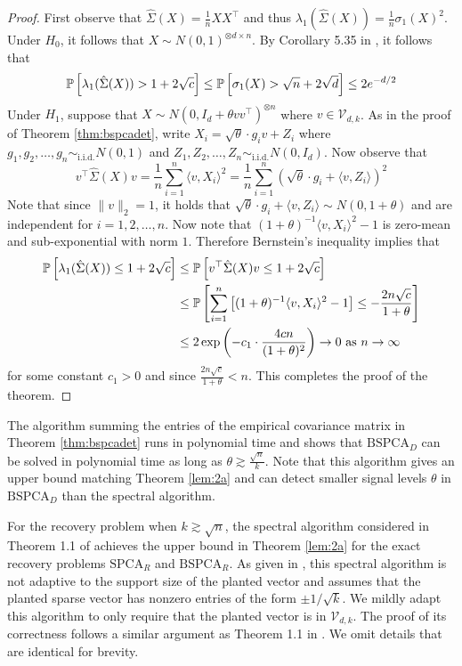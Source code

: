 \begin{proof}
First observe that $\hat{\Sigma}(X) = \frac{1}{n} XX^\top$ and thus $\lambda_1(\hat{\Sigma}(X)) = \frac{1}{n} \sigma_1(X)^2$. Under $H_0$, it follows that $X \sim N(0, 1)^{\otimes d \times n}$. By Corollary 5.35 in \cite{vershynin2010introduction}, it follows that
$$\mathbb{P}\left[ \lambda_1(\hat{\Sigma}(X)) > 1 + 2\sqrt{c} \right] \le \mathbb{P}\left[ \sigma_1(X) > \sqrt{n} + 2\sqrt{d} \right] \le 2e^{-d/2}$$
Under $H_1$, suppose that $X \sim N(0, I_d + \theta vv^\top)^{\otimes n}$ where $v \in \mathcal{V}_{d, k}$. As in the proof of Theorem \ref{thm:bspcadet}, write $X_i = \sqrt{\theta} \cdot g_i v + Z_i$ where $g_1, g_2, \dots, g_n \sim_{\text{i.i.d.}} N(0, 1)$ and $Z_1, Z_2, \dots, Z_n \sim_{\text{i.i.d.}} N(0, I_d)$. Now observe that
$$v^\top \hat{\Sigma}(X) v = \frac{1}{n} \sum_{i = 1}^n \langle v, X_i \rangle^2 = \frac{1}{n} \sum_{i = 1}^n \left( \sqrt{\theta} \cdot g_i + \langle v, Z_i \rangle \right)^2$$
Note that since $\| v \|_2 = 1$, it holds that $\sqrt{\theta} \cdot g_i + \langle v, Z_i \rangle \sim N(0, 1 + \theta)$ and are independent for $i = 1, 2, \dots, n$. Now note that $(1 + \theta)^{-1} \langle v, X_i \rangle^2 - 1$ is zero-mean and sub-exponential with norm $1$. Therefore Bernstein's inequality implies that
\begin{align*}
\mathbb{P}\left[ \lambda_1(\hat{\Sigma}(X)) \le 1 + 2\sqrt{c} \right] &\le \mathbb{P}\left[ v^\top \hat{\Sigma}(X) v \le 1 + 2\sqrt{c} \right] \\
&\le \mathbb{P}\left[ \sum_{i = 1}^n \left[ (1 + \theta)^{-1} \langle v, X_i \rangle^2 - 1 \right] \le - \frac{2n\sqrt{c}}{1 + \theta} \right] \\
&\le 2 \exp \left( - c_1 \cdot \frac{4cn}{(1 + \theta)^2} \right) \to 0 \text{ as } n \to \infty
\end{align*}
for some constant $c_1 > 0$ and since $\frac{2n\sqrt{c}}{1 + \theta} < n$. This completes the proof of the theorem.
\end{proof}

The algorithm summing the entries of the empirical covariance matrix in Theorem \ref{thm:bspcadet} runs in polynomial time and shows that $\text{BSPCA}_D$ can be solved in polynomial time as long as $\theta \gtrsim \frac{\sqrt{n}}{k}$. Note that this algorithm gives an upper bound matching Theorem \ref{lem:2a} and can detect smaller signal levels $\theta$ in $\text{BSPCA}_D$ than the spectral algorithm.

For the recovery problem when $k \gtrsim \sqrt{n}$, the spectral algorithm considered in Theorem 1.1 of \cite{krauthgamer2015semidefinite} achieves the upper bound in Theorem \ref{lem:2a} for the exact recovery problems $\text{SPCA}_R$ and $\text{BSPCA}_R$. As given in \cite{krauthgamer2015semidefinite}, this spectral algorithm is not adaptive to the support size of the planted vector and assumes that the planted sparse vector has nonzero entries of the form $\pm 1/\sqrt{k}$. We mildly adapt this algorithm to only require that the planted vector is in $\mathcal{V}_{d, k}$. The proof of its correctness follows a similar argument as Theorem 1.1 in \cite{krauthgamer2015semidefinite}. We omit details that are identical for brevity.

